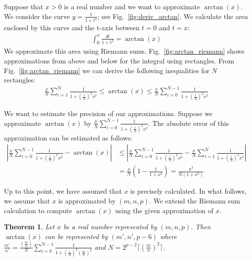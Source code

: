 \documentclass{article}
\newtheorem{mytheorem}{Theorem}
\numberwithin{mytheorem}{section}
\newcommand{\arctansumu}[2] {\frac{#1}{#2} \sum_{i=0}^{#2-1}\frac{1}{1+(\frac{i}{#2})^2{#1}^2}}
\newcommand{\arctansuml}[2] {\frac{#1}{#2} \sum_{i=1}^{#2}\frac{1}{1+(\frac{i}{#2})^2{#1}^2}}
\begin{document}
Suppose that $x>0$ is a real number and we want to approximate $\arctan(x)$. We consider the curve $y=\frac{1}{1+t^2}$; see Fig.~\ref{fig:deriv_arctan}. We calculate the area enclosed by this curve and the t-axis between $t=0$ and $t=x$:
\begin{align*}
\int_0^{x} \frac{dt}{1+t^2}=\arctan(x)
\end{align*}
We approximate this area using Riemann sums. Fig.~\ref{fig:arctan_riemann} shows approximations from above and below for the integral using rectangles. From Fig.~\ref{fig:arctan_riemann} we can derive the following inequalities for $N$ rectangles:
\begin{align*}
\arctansuml{x}{N} \leq \arctan(x) \leq \arctansumu{x}{N}
\end{align*}

We want to estimate the precision of our approximations. Suppose we approximate $\arctan(x)$ by $\arctansumu{x}{N}$. The absolute error of this approximation can be estimated as follows:
\begin{align}
|\arctansumu{x}{N}-\arctan(x)|&\leq |\arctansumu{x}{N}-\arctansuml{x}{N}|\nonumber\\
&=\frac{x}{N}(1-\frac{1}{1+x^2})=\frac{x^3}{N(1+x^2)}\label{eqn:arctan_riemann_prec}
\end{align}


Up to this point, we have assumed that $x$ is precisely calculated. In what follows, we assume that $x$ is approximated by $(m,n,p)$. We extend the Riemann sum calculation to compute $\arctan(x)$ using the given approximation of $x$. 
\begin{mytheorem}\label{thm:arctan}
Let $x$ be a real number represented by $(m,n,p)$. Then $\arctan(x)$ can be represented by $(m',n',p-6)$ where $\frac{m'}{n'}=\arctansumu{(\frac{m}{n})}{N}$ and $N= 2^{p-2}\lceil(\frac{m}{n})^2\rceil$.
\end{mytheorem}
\end{document}
